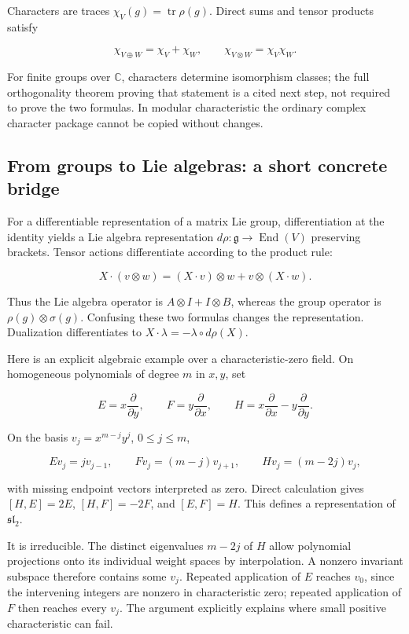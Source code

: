 \documentclass[
  11pt,
]{article}
\begin{document}
Characters are traces \(\chi_V(g)=\operatorname{tr}\rho(g)\). Direct
sums and tensor products satisfy

\[\chi_{V\oplus W}=\chi_V+\chi_W,\qquad
\chi_{V\otimes W}=\chi_V\chi_W.\]

For finite groups over \(\mathbb C\), characters determine isomorphism
classes; the full orthogonality theorem proving that statement is a
cited next step, not required to prove the two formulas. In modular
characteristic the ordinary complex character package cannot be copied
without changes.

\subsection{From groups to Lie algebras: a short concrete
bridge}\label{from-groups-to-lie-algebras-a-short-concrete-bridge}

For a differentiable representation of a matrix Lie group,
differentiation at the identity yields a Lie algebra representation
\(d\rho:\mathfrak g\to\operatorname{End}(V)\) preserving brackets.
Tensor actions differentiate according to the product rule:

\[X\cdot(v\otimes w)=(X\cdot v)\otimes w+v\otimes(X\cdot w).\]

Thus the Lie algebra operator is \(A\otimes I+I\otimes B\), whereas the
group operator is \(\rho(g)\otimes\sigma(g)\). Confusing these two
formulas changes the representation. Dualization differentiates to
\(X\cdot\lambda=-\lambda\circ d\rho(X)\).

Here is an explicit algebraic example over a characteristic-zero field.
On homogeneous polynomials of degree \(m\) in \(x,y\), set

\[E=x\frac{\partial}{\partial y},\qquad
F=y\frac{\partial}{\partial x},\qquad
H=x\frac{\partial}{\partial x}-y\frac{\partial}{\partial y}.\]

On the basis \(v_j=x^{m-j}y^j\), \(0\le j\le m\),

\[Ev_j=jv_{j-1},\qquad Fv_j=(m-j)v_{j+1},\qquad Hv_j=(m-2j)v_j,\]

with missing endpoint vectors interpreted as zero. Direct calculation
gives \([H,E]=2E\), \([H,F]=-2F\), and \([E,F]=H\). This defines a
representation of \(\mathfrak{sl}_2\).

It is irreducible. The distinct eigenvalues \(m-2j\) of \(H\) allow
polynomial projections onto its individual weight spaces by
interpolation. A nonzero invariant subspace therefore contains some
\(v_j\). Repeated application of \(E\) reaches \(v_0\), since the
intervening integers are nonzero in characteristic zero; repeated
application of \(F\) then reaches every \(v_j\). The argument explicitly
explains where small positive characteristic can fail.
\end{document}
